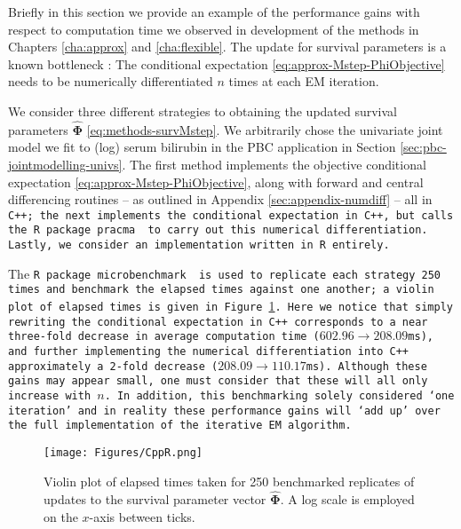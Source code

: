 Briefly in this section we provide an example of the performance gains with respect to computation time we observed in development of the methods in Chapters \ref{cha:approx} and \ref{cha:flexible}. The update for survival parameters is a known bottleneck \citep{Hickey2018}: The conditional expectation \eqref{eq:approx-Mstep-PhiObjective} needs to be numerically differentiated $n$ times at each EM iteration. 

We consider three different strategies to obtaining the updated survival parameters $\hat{\bm{\Phi}}$ \eqref{eq:methods-survMstep}. We arbitrarily chose the univariate joint model we fit to (log) serum bilirubin in the PBC application in Section \ref{sec:pbc-jointmodelling-univs}. The first method implements the objective conditional expectation \eqref{eq:approx-Mstep-PhiObjective}, along with forward and central differencing routines -- as outlined in Appendix \ref{sec:appendix-numdiff} -- all in \tt{C++}; the next implements the conditional expectation in \tt{C++}, but calls the \tt{R} package \tt{pracma} \citep{R-pracma} to carry out this numerical differentiation. Lastly, we consider an implementation written in \tt{R} entirely.

The \tt{R} package \tt{microbenchmark} \citep{R-microbenchmark} is used to replicate each strategy 250 times and benchmark the elapsed times against one another; a violin plot of elapsed times is given in Figure \ref{fig:appendix-gmvjoint-elapsed}. Here we notice that simply rewriting the conditional expectation in \tt{C++} corresponds to a near three-fold decrease in average computation time ($602.96\rightarrow208.09$ms), and further implementing the numerical differentiation into \tt{C++} approximately a 2-fold decrease ($208.09\rightarrow110.17$ms). Although these gains may appear small, one must consider that these will all only increase with $n$. In addition, this benchmarking solely considered `one iteration' and in reality these performance gains will `add up' over the full implementation of the iterative EM algorithm.

\begin{figure}
    \centering
    \texttt{[image: Figures/CppR.png]}
    \caption{Violin plot of elapsed times taken for 250 benchmarked replicates of updates to the survival parameter vector $\hat{\bm{\Phi}}$. A log scale is employed on the $x$-axis between ticks.}
    \label{fig:appendix-gmvjoint-elapsed}
\end{figure}
